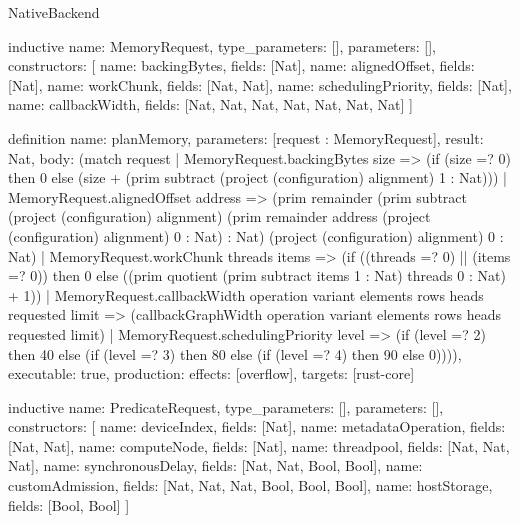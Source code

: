 \begin{lexlean}{NativeBackend}
\begin{semanticmodule}
inductive{
  name: MemoryRequest,
  type_parameters: [],
  parameters: [],
  constructors: [
    {name: backingBytes, fields: [Nat]},
    {name: alignedOffset, fields: [Nat]},
    {name: workChunk, fields: [Nat, Nat]},
    {name: schedulingPriority, fields: [Nat]},
    {name: callbackWidth, fields: [Nat, Nat, Nat, Nat, Nat, Nat, Nat]}
  ]
}

definition{
  name: planMemory,
  parameters: [request : MemoryRequest],
  result: Nat,
  body: (match request
    | MemoryRequest.backingBytes size => (if (size =? 0) then 0 else (size + (prim subtract (project (configuration) alignment) 1 : Nat)))
    | MemoryRequest.alignedOffset address => (prim remainder (prim subtract (project (configuration) alignment) (prim remainder address (project (configuration) alignment) 0 : Nat) : Nat) (project (configuration) alignment) 0 : Nat)
    | MemoryRequest.workChunk threads items => (if ((threads =? 0) || (items =? 0)) then 0 else ((prim quotient (prim subtract items 1 : Nat) threads 0 : Nat) + 1))
    | MemoryRequest.callbackWidth operation variant elements rows heads requested limit => (callbackGraphWidth operation variant elements rows heads requested limit)
    | MemoryRequest.schedulingPriority level => (if (level =? 2) then 40 else (if (level =? 3) then 80 else (if (level =? 4) then 90 else 0)))),
  executable: true,
  production: {effects: [overflow], targets: [rust-core]}
}

inductive{
  name: PredicateRequest,
  type_parameters: [],
  parameters: [],
  constructors: [
    {name: deviceIndex, fields: [Nat]},
    {name: metadataOperation, fields: [Nat, Nat]},
    {name: computeNode, fields: [Nat]},
    {name: threadpool, fields: [Nat, Nat, Nat]},
    {name: synchronousDelay, fields: [Nat, Nat, Bool, Bool]},
    {name: customAdmission, fields: [Nat, Nat, Nat, Bool, Bool, Bool]},
    {name: hostStorage, fields: [Bool, Bool]}
  ]
}


\end{semanticmodule}
\end{lexlean}
